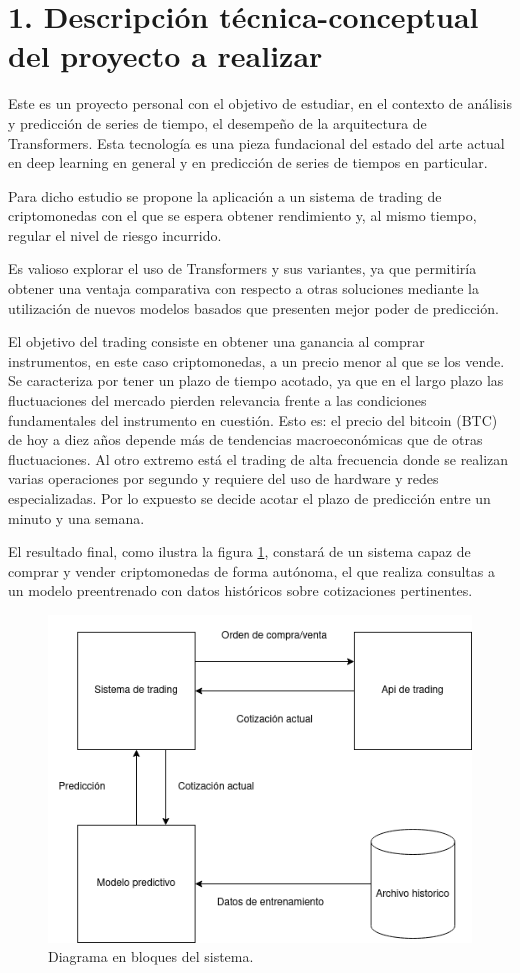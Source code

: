 \documentclass[
    11pt, %
]{charter}
\begin{document}
    \section{1. Descripción técnica-conceptual del proyecto a realizar}
    \label{sec:descripcion}
    Este es un proyecto personal con el objetivo de estudiar, en el contexto de análisis y predicción de series de tiempo,
    el desempeño de la arquitectura de Transformers. Esta tecnología es una pieza fundacional del estado del arte actual
    en deep learning en general y en predicción de series de tiempos en particular.

    Para dicho estudio se propone la aplicación a un sistema de trading de criptomonedas con el que se espera obtener
    rendimiento y, al mismo tiempo, regular el nivel de riesgo incurrido.

    Es valioso explorar el uso de Transformers y sus variantes, ya que permitiría obtener una ventaja comparativa con
    respecto a otras soluciones mediante la utilización de nuevos modelos basados que presenten mejor poder de predicción.

    El objetivo del trading consiste en obtener una ganancia al comprar instrumentos, en este caso criptomonedas, a un precio menor al que se los vende.
    Se caracteriza por tener un plazo de tiempo acotado, ya que en el largo plazo las fluctuaciones del mercado pierden relevancia
    frente a las condiciones fundamentales del instrumento en cuestión.
    Esto es: el precio del bitcoin (BTC) de hoy a diez años depende más de tendencias macroeconómicas que de otras fluctuaciones.
    Al otro extremo está el trading de alta frecuencia donde se realizan varias operaciones por segundo y requiere del uso de hardware y redes especializadas.
    Por lo expuesto se decide acotar el plazo de predicción entre un minuto y una semana.

    El resultado final, como ilustra la figura \ref{fig:diagBloques}, constará de un sistema capaz de comprar y vender criptomonedas de forma autónoma, el que realiza consultas a un modelo preentrenado con datos históricos sobre cotizaciones pertinentes.


    \begin{figure}[htpb]
            \centering
            \includegraphics[width=.65\textwidth]{./Figuras/bloques-tp-final.drawio.png}
            \caption{Diagrama en bloques del sistema.}
            \label{fig:diagBloques}
        \end{figure}
\end{document}
